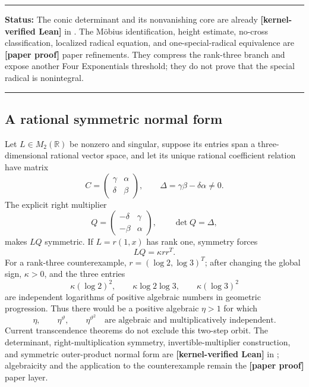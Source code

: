 \documentclass[11pt,oneside]{article}
\theoremstyle{definition}
\theoremstyle{remark}
\newcommand{\R}{\mathbb R}
\newcommand{\thetaq}{\vartheta}
\newcommand{\lean}[1]{\texttt{\detokenize{#1}}}
\newcommand{\statuslean}{\textcolor{leanblue}{\textbf{[kernel-verified Lean]}}}
\newcommand{\statusnew}{\textcolor{newgreen}{\textbf{[paper proof]}}}
\newenvironment{statusbox}[1]
{\begin{center}\begin{minipage}{0.94\textwidth}\raggedright\hbadness=10000\hrule
\vspace{0.45em}\textbf{Status:} #1\par\vspace{0.35em}}
{\vspace{0.35em}\hrule\end{minipage}\end{center}}
\begin{document}
\begin{statusbox}{The conic determinant and its nonvanishing core are already
\statuslean{} in \lean{RankGeometry}.  The M\"obius identification, height estimate,
no-cross classification, localized radical equation, and one-special-radical equivalence are
\statusnew{} paper refinements.  They compress the rank-three branch and expose another
Four Exponentials threshold; they do not prove that the special radical is nonintegral.}
\end{statusbox}

\subsection{A rational symmetric normal form}
\label{rankgeom:symmetrization}

Let $L\in M_2(\R)$ be nonzero and singular, suppose its entries span a three-dimensional
rational vector space, and let its unique rational coefficient relation have matrix
\[
 C=\begin{pmatrix}\gamma&\alpha\\ \delta&\beta\end{pmatrix},
 \qquad \Delta=\gamma\beta-\delta\alpha\ne0.
\]
The explicit right multiplier
\begin{equation}
 Q=\begin{pmatrix}-\delta&\gamma\\-\beta&\alpha\end{pmatrix},
 \qquad \det Q=\Delta,
 \label{rankgeom:eq-symmetrizer}
\end{equation}
makes $LQ$ symmetric.  If $L=r(1,x)$ has rank one, symmetry forces
\[
 LQ=\kappa rr^T.
\]
For a rank-three counterexample, $r=(\log2,\log3)^T$; after changing the global sign,
$\kappa>0$, and the three entries
\[
 \kappa(\log2)^2,\qquad \kappa\log2\log3,\qquad \kappa(\log3)^2
\]
are independent logarithms of positive algebraic numbers in geometric progression.  Thus
there would be a positive algebraic $\eta>1$ for which
\begin{equation}
 \eta,\qquad \eta^{\thetaq},\qquad \eta^{\thetaq^2}
 \quad\text{are algebraic and multiplicatively independent}.
 \label{rankgeom:eq-algebraic-orbit}
\end{equation}
Current transcendence theorems do not exclude this two-step orbit.  The determinant,
right-multiplication symmetry, invertible-multiplier construction, and symmetric outer-product
normal form are \statuslean{} in \lean{RankGeometry}; algebraicity and the application
to the counterexample remain the \statusnew{} paper layer.
\end{document}
